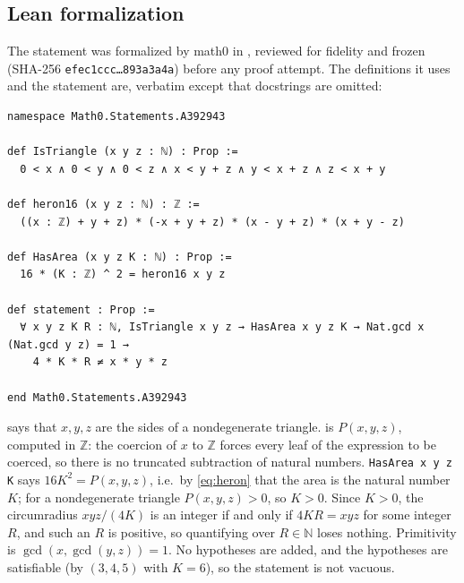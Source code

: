 \documentclass[11pt]{amsart}
\theoremstyle{plain}
\theoremstyle{definition}
\newcommand{\N}{\mathbb{N}}
\newcommand{\Z}{\mathbb{Z}}
\begin{document}
\subsection*{Lean formalization}
The statement was formalized by math0 in , reviewed for fidelity and frozen (SHA-256 \texttt{efec1ccc\ldots 893a3a4a}) before any proof attempt. The definitions it uses and the statement are, verbatim except that docstrings are omitted:
\begin{lstlisting}
namespace Math0.Statements.A392943

def IsTriangle (x y z : ℕ) : Prop :=
  0 < x ∧ 0 < y ∧ 0 < z ∧ x < y + z ∧ y < x + z ∧ z < x + y

def heron16 (x y z : ℕ) : ℤ :=
  ((x : ℤ) + y + z) * (-x + y + z) * (x - y + z) * (x + y - z)

def HasArea (x y z K : ℕ) : Prop :=
  16 * (K : ℤ) ^ 2 = heron16 x y z

def statement : Prop :=
  ∀ x y z K R : ℕ, IsTriangle x y z → HasArea x y z K → Nat.gcd x (Nat.gcd y z) = 1 →
    4 * K * R ≠ x * y * z

end Math0.Statements.A392943
\end{lstlisting}
 says that $x,y,z$ are the sides of a nondegenerate triangle.  is $P(x,y,z)$, computed in $\Z$: the coercion of $x$ to $\Z$ forces every leaf of the expression to be coerced, so there is no truncated subtraction of natural numbers. \texttt{HasArea x y z K} says $16K^2=P(x,y,z)$, i.e.\ by \eqref{eq:heron} that the area is the natural number $K$; for a nondegenerate triangle $P(x,y,z)>0$, so $K>0$. Since $K>0$, the circumradius $xyz/(4K)$ is an integer if and only if $4KR=xyz$ for some integer $R$, and such an $R$ is positive, so quantifying over $R\in\N$ loses nothing. Primitivity is $\gcd(x,\gcd(y,z))=1$. No hypotheses are added, and the hypotheses are satisfiable (by $(3,4,5)$ with $K=6$), so the statement is not vacuous.
\end{document}
